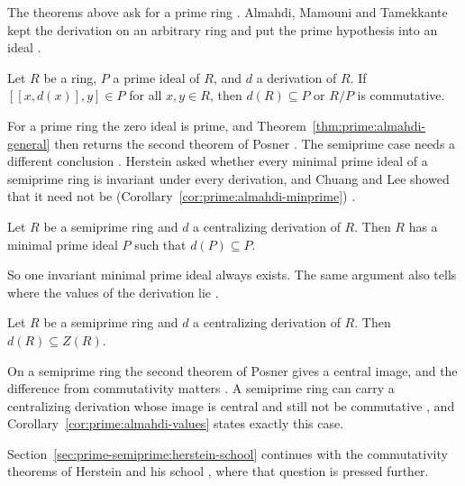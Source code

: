 The theorems above ask for a prime ring
\cite[p.~1093]{Posner1957}. Almahdi, Mamouni and Tamekkante kept the
derivation on an arbitrary ring and put the prime hypothesis into an ideal
\cite[p.~188]{AlmahdiMamouniTamekkante2020}.

\begin{theorem}\label{thm:prime:almahdi-general}
Let $R$ be a ring, $P$ a prime ideal of $R$, and $d$ a derivation of $R$. If
$[[x,d(x)],y]\in P$ for all $x,y\in R$, then $d(R)\subseteq P$ or $R/P$ is
commutative.
\end{theorem}

For a prime ring the zero ideal is prime, and
Theorem~\ref{thm:prime:almahdi-general} then returns the second theorem of
Posner \cite[p.~191]{AlmahdiMamouniTamekkante2020}. The semiprime case needs a
different conclusion \cite[p.~192]{AlmahdiMamouniTamekkante2020}. Herstein asked
whether every minimal prime ideal of a semiprime ring is invariant under every
derivation, and Chuang and Lee showed that it need not be (Corollary~\ref{cor:prime:almahdi-minprime})
\cite[p.~192]{AlmahdiMamouniTamekkante2020}.\begin{corollary}\label{cor:prime:almahdi-minprime}
Let $R$ be a semiprime ring and $d$ a centralizing derivation of $R$. Then $R$
has a minimal prime ideal $P$ such that $d(P)\subseteq P$.
\end{corollary}

So one invariant minimal prime ideal always exists. The same argument also tells
where the values of the derivation lie
\cite[p.~192]{AlmahdiMamouniTamekkante2020}.

\begin{corollary}\label{cor:prime:almahdi-values}
Let $R$ be a semiprime ring and $d$ a centralizing derivation of $R$. Then
$d(R)\subseteq Z(R)$.
\end{corollary}

On a semiprime ring the second theorem of Posner gives a central image, and the
difference from commutativity matters
\cite[p.~192]{AlmahdiMamouniTamekkante2020}. A semiprime ring can carry a
centralizing derivation whose image is central and still not be commutative
\cite[p.~192]{AlmahdiMamouniTamekkante2020}, and
Corollary~\ref{cor:prime:almahdi-values} states exactly this case.

Section~\ref{sec:prime-semiprime:herstein-school} continues with the
commutativity theorems of Herstein and his school
\cite[p.~192]{AlmahdiMamouniTamekkante2020}, where that question is pressed
further.

